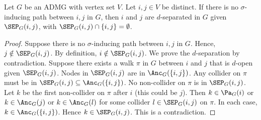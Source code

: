 \begin{Prp}
  Let $G$ be an ADMG with vertex set $V$.
  Let $i,j \in V$ be distinct.
  If there is no $\sigma$-inducing path between $i,j$ in $G$, then $i$ and $j$ are $d$-separated in $G$ given $\SEP_G(i,j)$,
  with $\SEP_G(i,j) \cap \{i,j\} = \emptyset$.
\end{Prp}
\begin{proof}
  Suppose there is no $\sigma$-inducing path between $i,j$ in $G$.
  Hence, $j \notin \SEP_G(i,j)$.
  By definition, $i \notin \SEP_G(i,j)$.
  We prove the $d$-separation by contradiction.
  Suppose there exists a walk $\pi$ in $G$ between $i$ and $j$ that is $d$-open given $\SEP_G(i,j)$.
  Nodes in $\SEP_G(i,j)$ are in $\Anc_G(\{i,j\})$.
  Any collider on $\pi$ must be in $\SEP_G(i,j) \subseteq \Anc_G(\{i,j\})$.
  No non-collider on $\pi$ is in $\SEP_G(i,j)$.
  Let $k$ be the first non-collider on $\pi$ after $i$ (this could be $j$).
  Then $k \in \Pa_G(i)$ or $k \in \Anc_G(j)$ or $k \in \Anc_G(l)$ for some collider $l \in \SEP_G(i,j)$ on $\pi$.
  In each case, $k \in \Anc_G(\{i,j\})$.
  Hence $k \in \SEP_G(i,j)$.
  This is a contradiction.
\end{proof}
